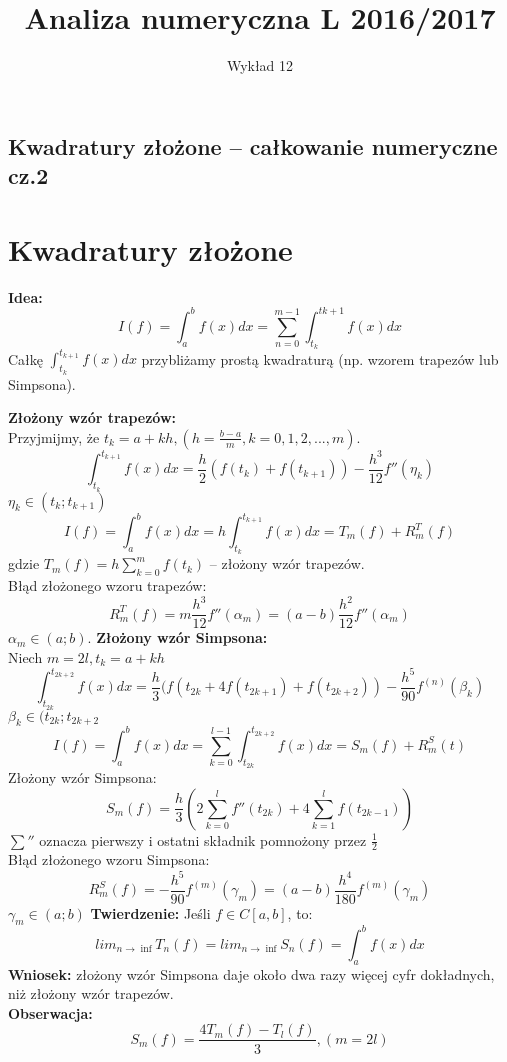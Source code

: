 \documentclass[12pt]{article}
\author{\LARGE Wykład 12}
\title{\bfseries\Huge Analiza numeryczna L 2016/2017}
\date{}
\begin{document}
\maketitle
\begin{center}
\section*{\Large Kwadratury złożone -- całkowanie numeryczne cz.2 }

\end{center}
\vspace{5mm}
\section*{Kwadratury złożone}
\textbf{Idea:}
$$I(f) = \int^b_af(x)dx = \sum^{m-1}_{n=0} \int^{t{k+1}}_{t_k} f(x)dx$$
Całkę $\int^{t_{k+1}}_{t_k} f(x)dx$ przybliżamy prostą kwadraturą (np. wzorem trapezów lub Simpsona).\\
\linebreak


\textbf{Złożony wzór trapezów:}\\
Przyjmijmy, że $t_k=a +kh, (h = \frac{b-a}{m}, k = 0,1,2,...,m)$.
$$\int^{t_{k+1}}_{t_k} f(x)dx = \frac{h}{2}(f(t_k) + f(t_{k+1})) - \frac{h^3}{12}f''(\eta_k)$$
$\eta_k \in (t_k;t_{k+1})$
$$I(f) = \int^b_af(x)dx = h\int^{t_{k+1}}_{t_k} f(x)dx = T_m(f) + R^T_m(f)$$
gdzie $T_m(f) = h \sum^m_{k=0}f(t_k)$ -- złożony wzór trapezów.\\
\linebreak
Błąd złożonego wzoru trapezów:
$$R^T_m(f) = m\frac{h^3}{12}f''(\alpha_m) = (a-b)\frac{h^2}{12}f''(\alpha_m)$$
$\alpha_m \in (a;b)$.
\newpage
{}
\setcounter{page}{2}
\textbf{Złożony wzór Simpsona:}\\
Niech $m=2l, t_k=a + kh$
$$\int^{t_{2k+2}}_{t_{2k}} f(x)dx = \frac{h}{3}(f(t_{2k} + 4f(t_{2k+1}) +f(t_{2k+2}))- \frac{h^5}{90}f^{(n)}(\beta_k)$$
$\beta_k \in (t_{2k};t_{2k+2}$
$$I(f) = \int^b_af(x)dx = \sum^{l-1}_{k=0} \int^{t_{2k+2}}_{t_{2k}} f(x)dx = S_m(f) + R^S_m(t)$$
Złożony wzór Simpsona:
$$ S_m(f) =  \frac{h}{3}(2 \sum^l_{k=0}f''(t_{2k}) + 4\sum^l_{k=1} f(t_{2k-1}))$$
$\sum ''$ oznacza pierwszy i ostatni składnik pomnożony przez $\frac{1}{2}$\\
\linebreak
Błąd złożonego wzoru Simpsona:
$$R_m^S(f) = -\frac{h^5}{90}f^{(m)}(\gamma_m) = (a-b)\frac{h^4}{180}f^{(m)}(\gamma_m)$$
$\gamma_m \in (a;b)$
\textbf{Twierdzenie:} Jeśli $f \in C[a,b]$, to:
$$ lim_{n \rightarrow \inf} T_n(f) = lim_{n \rightarrow \inf} S_n(f) = \int^b_a f(x)dx $$
\textbf{Wniosek:} złożony wzór Simpsona daje około dwa razy więcej cyfr dokładnych, niż złożony wzór trapezów.\\
\textbf{Obserwacja:}
$$S_m(f) = \frac{4T_m(f) - T_l(f)}{3}, (m=2l)$$
\newpage
\end{document}
